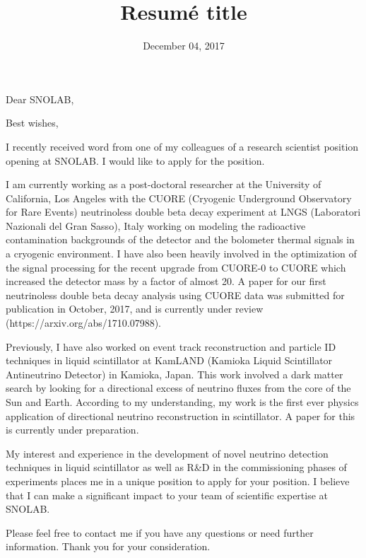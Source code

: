\documentclass[11pt,a4paper,sans]{moderncv}        %
\title{Resumé title}                               %
\begin{document}
\date{December 04, 2017}
\opening{Dear SNOLAB,}
\closing{Best wishes,}
\makelettertitle

I recently received word from one of my colleagues of a research scientist
position opening at SNOLAB. I would like to apply for the position.

I am currently working as a post-doctoral researcher at the University of
California, Los Angeles with the CUORE (Cryogenic Underground Observatory for
Rare Events) neutrinoless double beta decay experiment at LNGS (Laboratori
Nazionali del Gran Sasso), Italy working on modeling the radioactive
contamination backgrounds of the detector and the bolometer thermal signals in a
cryogenic environment. I have also been heavily involved in the optimization of
the signal processing for the recent upgrade from CUORE-0 to CUORE which
increased the detector mass by a factor of almost 20. A paper for our first
neutrinoless double beta decay analysis using CUORE data was submitted for
publication in October, 2017, and is currently under review (https://arxiv.org/abs/1710.07988).

Previously, I have also worked on event track reconstruction and particle ID
techniques in liquid scintillator at KamLAND (Kamioka Liquid Scintillator
Antineutrino Detector) in Kamioka, Japan. This work involved a dark matter
search by looking for a directional excess of neutrino fluxes from the core of
the Sun and Earth. According to my understanding, my work is the first ever
physics application of directional neutrino reconstruction in scintillator. A
paper for this is currently under preparation.

My interest and experience in the development of novel neutrino detection
techniques in liquid scintillator as well as R\&D in the commissioning phases
of experiments places me in a unique position to apply for your position. I
believe that I can make a significant impact to your team of scientific
expertise at SNOLAB.

Please feel free to contact me if you have any questions or need further
information. Thank you for your consideration.

\makeletterclosing
\end{document}
